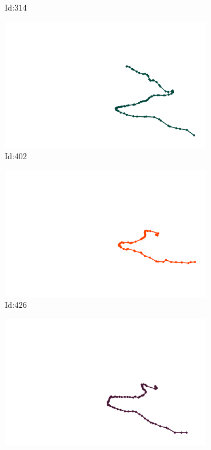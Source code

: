 \documentclass[12pt,twoside]{report}
\begin{document}
\begin{figure}
\begin{subfigure}[b]{0.20\textwidth}
\caption{Id:314}
\end{subfigure}
\begin{subfigure}[b]{0.20\textwidth}
\centering
\includegraphics[width=\textwidth]{../trajectories/402.png}
\caption{Id:402}
\end{subfigure}
\begin{subfigure}[b]{0.20\textwidth}
\centering
\includegraphics[width=\textwidth]{../trajectories/426.png}
\caption{Id:426}
\end{subfigure}
\begin{subfigure}[b]{0.20\textwidth}
\centering
\includegraphics[width=\textwidth]{../trajectories/491.png}

\end{subfigure}
\end{figure}
\end{document}
